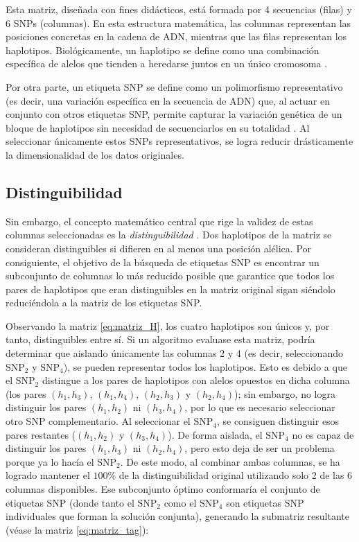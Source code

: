 Esta matriz, diseñada con fines didácticos, está formada por 4 secuencias (filas) y 6 SNPs (columnas). En esta estructura matemática, las columnas representan las posiciones concretas en la cadena de ADN, mientras que las filas representan los haplotipos. Biológicamente, un haplotipo se define como una combinación específica de alelos que tienden a heredarse juntos en un único cromosoma \cite{bafna2003haplotypes}.

Por otra parte, un etiqueta SNP se define como un polimorfismo representativo (es decir, una variación específica en la secuencia de ADN) que, al actuar en conjunto con otros etiquetas SNP, permite capturar la variación genética de un bloque de haplotipos sin necesidad de secuenciarlos en su totalidad \cite{bafna2003haplotypes, ting2010multi}. Al seleccionar únicamente estos SNPs representativos, se logra reducir drásticamente la dimensionalidad de los datos originales. 

\subsection{Distinguibilidad}
Sin embargo, el concepto matemático central que rige la validez de estas columnas seleccionadas es la \textit{distinguibilidad} \cite{bafna2003haplotypes}. Dos haplotipos de la matriz se consideran distinguibles si difieren en al menos una posición alélica. Por consiguiente, el objetivo de la búsqueda de etiquetas SNP es encontrar un subconjunto de columnas lo más reducido posible que garantice que todos los pares de haplotipos que eran distinguibles en la matriz original sigan siéndolo reduciéndola a la matriz de los etiquetas SNP.

Observando la matriz \ref{eq:matriz_H}, los cuatro haplotipos son únicos y, por tanto, distinguibles entre sí. Si un algoritmo evaluase esta matriz, podría determinar que aislando únicamente las columnas 2 y 4 (es decir, seleccionando $\text{SNP}_2$ y $\text{SNP}_4$), se pueden representar todos los haplotipos. Esto es debido a que el $\text{SNP}_2$ distingue a los pares de haplotipos con alelos opuestos en dicha columna (los pares $(h_1, h_3)$, $(h_1, h_4)$, $(h_2, h_3)$ y $(h_2, h_4)$); sin embargo, no logra distinguir los pares $(h_1, h_2)$ ni $(h_3, h_4)$, por lo que es necesario seleccionar otro SNP complementario. Al seleccionar el $\text{SNP}_4$, se consiguen distinguir esos pares restantes ($(h_1, h_2)$ y $(h_3, h_4)$). De forma aislada, el $\text{SNP}_4$ no es capaz de distinguir los pares $(h_1, h_3)$ ni $(h_2, h_4)$, pero esto deja de ser un problema porque ya lo hacía el $\text{SNP}_2$. De este modo, al combinar ambas columnas, se ha logrado mantener el $100\%$ de la distinguibilidad original utilizando solo 2 de las 6 columnas disponibles. Ese subconjunto óptimo conformaría el conjunto de etiquetas SNP (donde tanto el $\text{SNP}_2$ como el $\text{SNP}_4$ son etiquetas SNP individuales que forman la solución conjunta), generando la submatriz resultante (véase la matriz \ref{eq:matriz_tag}):


